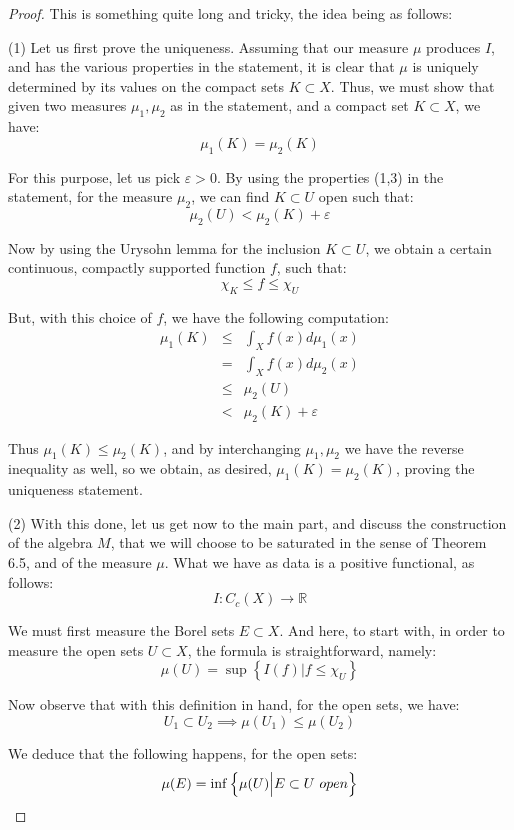 \documentclass[10pt,a4paper]{amsart}
\begin{document}
\begin{proof}
This is something quite long and tricky, the idea being as follows:

\medskip

(1) Let us first prove the uniqueness. Assuming that our measure $\mu$ produces $I$, and has the various properties in the statement, it is clear that $\mu$ is uniquely determined by its values on the compact sets $K\subset X$. Thus, we must show that given two measures $\mu_1,\mu_2$ as in the statement, and a compact set $K\subset X$, we have:
$$\mu_1(K)=\mu_2(K)$$

For this purpose, let us pick $\varepsilon>0$. By using the properties (1,3) in the statement, for the measure $\mu_2$, we can find $K\subset U$ open such that:
$$\mu_2(U)<\mu_2(K)+\varepsilon$$

Now by using the Urysohn lemma for the inclusion $K\subset U$, we obtain a certain continuous, compactly supported function $f$, such that:
$$\chi_K\leq f\leq\chi_U$$

But, with this choice of $f$, we have the following computation:
\begin{eqnarray*}
\mu_1(K)
&\leq&\int_Xf(x)d\mu_1(x)\\
&=&\int_Xf(x)d\mu_2(x)\\
&\leq&\mu_2(U)\\
&<&\mu_2(K)+\varepsilon
\end{eqnarray*}

Thus $\mu_1(K)\leq\mu_2(K)$, and by interchanging $\mu_1,\mu_2$ we have the reverse inequality as well, so we obtain, as desired, $\mu_1(K)=\mu_2(K)$, proving the uniqueness statement.

\medskip

(2) With this done, let us get now to the main part, and discuss the construction of the algebra $M$, that we will choose to be saturated in the sense of Theorem 6.5, and of the measure $\mu$. What we have as data is a positive functional, as follows:
$$I:C_c(X)\to\mathbb R$$

We must first measure the Borel sets $E\subset X$. And here, to start with, in order to measure the open sets $U\subset X$, the formula is straightforward, namely:
$$\mu(U)=\sup\left\{I(f)\Big| f\leq\chi_U\right\}$$

Now observe that with this definition in hand, for the open sets, we have:
$$U_1\subset U_2\implies\mu(U_1)\leq\mu(U_2)$$

We deduce that the following happens, for the open sets:
$$\mu(E)=\inf\left\{\mu(U)\Big| E\subset U\ {\rm open}\right\}$$


\end{proof}
\end{document}
